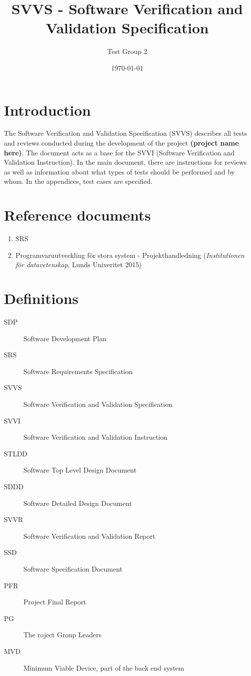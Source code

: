 \documentclass[a4paper]{article}
\title{SVVS - Software Verification and Validation Specification}
\date{\today}
\author{Test Group 2}
\begin{document}
\maketitle


\pagebreak
\setcounter{tocdepth}{2}
\tableofcontents
\pagebreak


\section{Introduction}
The Software Verification and Validation Specification (SVVS) describes all tests and reviews conducted during the development of the project \textbf{(project name here)}. The document acts as a base for the SVVI (Software Verification and Validation Instruction).
In the main document, there are instructions for reviews as well as information about what types of tests should be performed and by whom. In the appendices, test cases are specified.

\section{Reference documents}
\begin{enumerate}
\item SRS \label{refdocs:srs}
\item Programvaruutveckling för stora system - Projekthandledning (\textit{Institutionen för datavetenskap}, Lunds Univeritet 2015) \label{refdocs:projekthandledning}
\end{enumerate}

\section{Definitions}
\begin{description}
\item[SDP] Software Development Plan
\item[SRS] Software Requirements Specification
\item[SVVS] Software Verification and Validation Specification
\item[SVVI] Software Verification and Validation Instruction
\item[STLDD] Software Top Level Design Document
\item[SDDD] Software Detailed Design Document
\item[SVVR] Software Verification and Validation Report
\item[SSD] Software Specification Document
\item[PFR] Project Final Report
\item[PG] The roject Group Leaders
\item[MVD] Minimum Viable Device, part of the back end system
\end{description}
\end{document}
